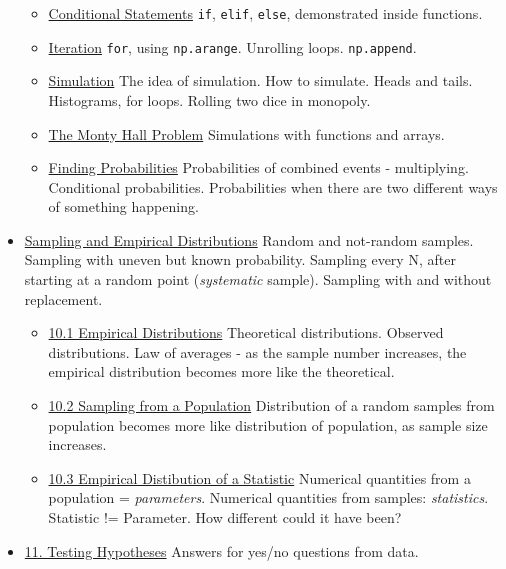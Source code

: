 \begin{itemize}
  \begin{itemize}
  \tightlist
  \item
    \href{chapters/08/1/conditional-statements.md}{Conditional
    Statements} \texttt{if}, \texttt{elif}, \texttt{else}, demonstrated
    inside functions.
  \item
    \href{chapters/08/2/iteration.md}{Iteration} \texttt{for}, using
    \texttt{np.arange}. Unrolling loops. \texttt{np.append}.
  \item
    \href{notebooks/09/3/Simulation.ipynb}{Simulation} The idea of
    simulation. How to simulate. Heads and tails. Histograms, for loops.
    Rolling two dice in monopoly.
  \item
    \href{chapters/08/3/monty-hall-problem.md}{The Monty Hall Problem}
    Simulations with functions and arrays.
  \item
    \href{chapters/08/4/finding-probabilities.md}{Finding Probabilities}
    Probabilities of combined events - multiplying. Conditional
    probabilities. Probabilities when there are two different ways of
    something happening.
  \end{itemize}
\item
  \href{notebooks/10/Sampling_and_Empirical_Distributions.ipynb}{Sampling
  and Empirical Distributions} Random and not-random samples. Sampling
  with uneven but known probability. Sampling every N, after starting at
  a random point (\emph{systematic} sample). Sampling with and without
  replacement.

  \begin{itemize}
  \tightlist
  \item
    \href{notebooks/10/1/Empirical_Distributions.ipynb}{10.1 Empirical
    Distributions} Theoretical distributions. Observed distributions.
    Law of averages - as the sample number increases, the empirical
    distribution becomes more like the theoretical.
  \item
    \href{notebooks/10/2/Sampling_from_a_Population.ipynb}{10.2 Sampling
    from a Population} Distribution of a random samples from population
    becomes more like distribution of population, as sample size
    increases.
  \item
    \href{notebooks/10/3/Empirical_Distribution_of_a_Statistic.ipynb}{10.3
    Empirical Distibution of a Statistic} Numerical quantities from a
    population = \emph{parameters}. Numerical quantities from samples:
    \emph{statistics}. Statistic != Parameter. How different could it
    have been?
  \end{itemize}
\item
  \href{notebooks/11/Testing_Hypotheses.ipynb}{11. Testing Hypotheses}
  Answers for yes/no questions from data.


\end{itemize}
